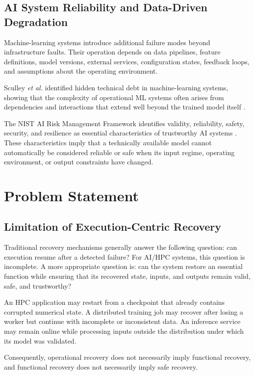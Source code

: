 \documentclass[conference]{IEEEtran}
\begin{document}
\subsection{AI System Reliability and Data-Driven Degradation}

Machine-learning systems introduce additional failure modes beyond infrastructure faults. Their operation depends on data pipelines, feature definitions, model versions, external services, configuration states, feedback loops, and assumptions about the operating environment.

Sculley \emph{et al.} identified hidden technical debt in machine-learning systems, showing that the complexity of operational ML systems often arises from dependencies and interactions that extend well beyond the trained model itself \cite{sculley2015}.

The NIST AI Risk Management Framework identifies validity, reliability, safety, security, and resilience as essential characteristics of trustworthy AI systems \cite{nist2023}. These characteristics imply that a technically available model cannot automatically be considered reliable or safe when its input regime, operating environment, or output constraints have changed.

\section{Problem Statement}
\label{sec:problem}

\subsection{Limitation of Execution-Centric Recovery}

Traditional recovery mechanisms generally answer the following question: can execution resume after a detected failure? For AI/HPC systems, this question is incomplete. A more appropriate question is: can the system restore an essential function while ensuring that its recovered state, inputs, and outputs remain valid, safe, and trustworthy?

An HPC application may restart from a checkpoint that already contains corrupted numerical state. A distributed training job may recover after losing a worker but continue with incomplete or inconsistent data. An inference service may remain online while processing inputs outside the distribution under which its model was validated.

Consequently, operational recovery does not necessarily imply functional recovery, and functional recovery does not necessarily imply safe recovery.
\end{document}
